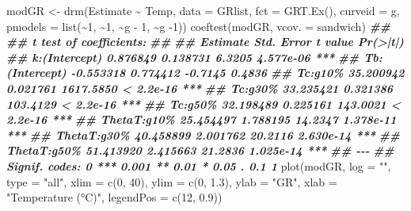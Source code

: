 \documentclass[
]{book}
\newenvironment{Shaded}{\begin{snugshade}}{\end{snugshade}}
\newcommand{\AttributeTok}[1]{\textcolor[rgb]{0.77,0.63,0.00}{#1}}
\newcommand{\DecValTok}[1]{\textcolor[rgb]{0.00,0.00,0.81}{#1}}
\newcommand{\DocumentationTok}[1]{\textcolor[rgb]{0.56,0.35,0.01}{\textbf{\textit{#1}}}}
\newcommand{\FloatTok}[1]{\textcolor[rgb]{0.00,0.00,0.81}{#1}}
\newcommand{\FunctionTok}[1]{\textcolor[rgb]{0.00,0.00,0.00}{#1}}
\newcommand{\NormalTok}[1]{#1}
\newcommand{\OtherTok}[1]{\textcolor[rgb]{0.56,0.35,0.01}{#1}}
\newcommand{\SpecialCharTok}[1]{\textcolor[rgb]{0.00,0.00,0.00}{#1}}
\newcommand{\StringTok}[1]{\textcolor[rgb]{0.31,0.60,0.02}{#1}}
\begin{document}
\begin{Shaded}
\begin{Highlighting}[]
\NormalTok{modGR }\OtherTok{\textless{}{-}} \FunctionTok{drm}\NormalTok{(Estimate }\SpecialCharTok{\textasciitilde{}}\NormalTok{ Temp, }\AttributeTok{data =}\NormalTok{ GRlist,}
               \AttributeTok{fct =} \FunctionTok{GRT.Ex}\NormalTok{(),}
             \AttributeTok{curveid =}\NormalTok{ g, }\AttributeTok{pmodels =} \FunctionTok{list}\NormalTok{(}\SpecialCharTok{\textasciitilde{}}\DecValTok{1}\NormalTok{, }\SpecialCharTok{\textasciitilde{}}\DecValTok{1}\NormalTok{, }\SpecialCharTok{\textasciitilde{}}\NormalTok{g }\SpecialCharTok{{-}} \DecValTok{1}\NormalTok{, }\SpecialCharTok{\textasciitilde{}}\NormalTok{g }\SpecialCharTok{{-}}\DecValTok{1}\NormalTok{))}
\FunctionTok{coeftest}\NormalTok{(modGR, }\AttributeTok{vcov. =}\NormalTok{ sandwich)}
\DocumentationTok{\#\# }
\DocumentationTok{\#\# t test of coefficients:}
\DocumentationTok{\#\# }
\DocumentationTok{\#\#                 Estimate Std. Error   t value  Pr(\textgreater{}|t|)    }
\DocumentationTok{\#\# k:(Intercept)   0.876849   0.138731    6.3205 4.577e{-}06 ***}
\DocumentationTok{\#\# Tb:(Intercept) {-}0.553318   0.774412   {-}0.7145    0.4836    }
\DocumentationTok{\#\# Tc:g10\%        35.200942   0.021761 1617.5850 \textless{} 2.2e{-}16 ***}
\DocumentationTok{\#\# Tc:g30\%        33.235421   0.321386  103.4129 \textless{} 2.2e{-}16 ***}
\DocumentationTok{\#\# Tc:g50\%        32.198489   0.225161  143.0021 \textless{} 2.2e{-}16 ***}
\DocumentationTok{\#\# ThetaT:g10\%    25.454497   1.788195   14.2347 1.378e{-}11 ***}
\DocumentationTok{\#\# ThetaT:g30\%    40.458899   2.001762   20.2116 2.630e{-}14 ***}
\DocumentationTok{\#\# ThetaT:g50\%    51.413920   2.415663   21.2836 1.025e{-}14 ***}
\DocumentationTok{\#\# {-}{-}{-}}
\DocumentationTok{\#\# Signif. codes:  0 \textquotesingle{}***\textquotesingle{} 0.001 \textquotesingle{}**\textquotesingle{} 0.01 \textquotesingle{}*\textquotesingle{} 0.05 \textquotesingle{}.\textquotesingle{} 0.1 \textquotesingle{} \textquotesingle{} 1}
\FunctionTok{plot}\NormalTok{(modGR, }\AttributeTok{log =} \StringTok{""}\NormalTok{, }\AttributeTok{type =} \StringTok{"all"}\NormalTok{, }\AttributeTok{xlim =} \FunctionTok{c}\NormalTok{(}\DecValTok{0}\NormalTok{, }\DecValTok{40}\NormalTok{),}
     \AttributeTok{ylim =} \FunctionTok{c}\NormalTok{(}\DecValTok{0}\NormalTok{, }\FloatTok{1.3}\NormalTok{),}
     \AttributeTok{ylab =} \StringTok{"GR"}\NormalTok{, }\AttributeTok{xlab =} \StringTok{"Temperature (°C)"}\NormalTok{,}
     \AttributeTok{legendPos =} \FunctionTok{c}\NormalTok{(}\DecValTok{12}\NormalTok{, }\FloatTok{0.9}\NormalTok{))}
\end{Highlighting}
\end{Shaded}
\end{document}
